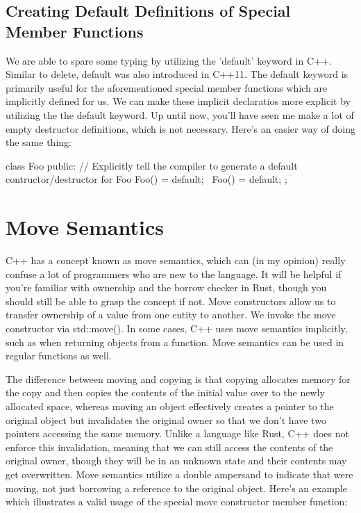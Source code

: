 \documentclass{article}
\begin{document}
\subsection{Creating Default Definitions of Special Member Functions}

We are able to spare some typing by utilizing the 'default' keyword in C++. Similar to delete, default was
also introduced in C++11. The default keyword is primarily useful for the aforementioned special member
functions which are implicitly defined for us. We can make these implicit declaratios more explicit by
utilizing the the default keyword. Up until now, you'll have seen me make a lot of empty destructor
definitions, which is not necessary. Here's an easier way of doing the same thing:

\begin{cpplst}

class Foo
{
public:
    // Explicitly tell the compiler to generate a default contructor/destructor for Foo
    Foo() = default;
    ~Foo() = default;
};

\end{cpplst}

\section{Move Semantics}

C++ has a concept known as move semantics, which can (in my opinion) really confuse a lot of programmers who
are new to the language. It will be helpful if you're familiar with ownership and the borrow checker in Rust,
though you should still be able to grasp the concept if not. Move constructors allow us to transfer
ownership of a value from one entity to another. We invoke the move constructor via std::move(). In some
cases, C++ uses move semantics implicitly, such as when returning objects from a function. Move semantics can
be used in regular functions as well.

The difference between moving and copying is that copying allocates memory for the copy and then copies the
contents of the initial value over to the newly allocated space, whereas moving an object effectively creates
a pointer to the original object but invalidates the original owner so that we don't have two pointers
accessing the same memory. Unlike a language like Rust, C++ does not enforce this invalidation, meaning that
we can still access the contents of the original owner, though they will be in an unknown state and their
contents may get overwritten. Move semantics utilize a double ampersand to indicate that were moving, not just
borrowing a reference to the original object. Here's an example which illustrates a valid usage of the special
move constructor member function:
\end{document}
